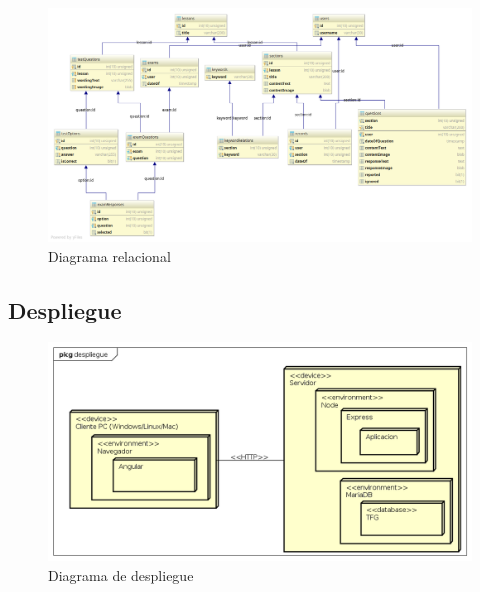 \documentclass[openright,twoside,10pt]{book}
\begin{document}
    \vspace*{\fill}
    
    \begin{figure}[H]
        \begin{center}
            \includegraphics[width=\textwidth, angle=-90]{img/astah/disenio/relacional/diagram.png}
        \end{center}
        \caption{Diagrama relacional}
    \end{figure}
    
    \vspace*{\fill} \newpage
    
    \subsection{Despliegue}\label{despliegue}
    
    \vspace*{\fill}
    
    \begin{figure}[H]
        \begin{center}
            \includegraphics[width=\textwidth, angle=-90]{img/astah/disenio/despliegue/deployment.png}
        \end{center}
        \caption{Diagrama de despliegue}
    \end{figure}
    
\end{document}
